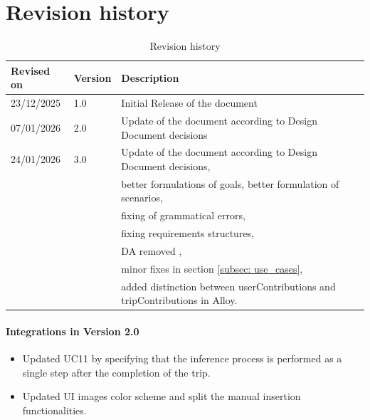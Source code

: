 \section{Revision history}
\label{sec:revision_history}%
\label{sec:definition_acronyms_abbreviations}%
\begin{table}[H]
    \begin{center}
        \begin{tabular}{ |l|l|l|}
            \hline
            \textbf{Revised on} & \textbf{Version}   & \textbf{Description}                           \\
            \hline
            23/12/2025             & 1.0   &   Initial Release of the document  \\
            \hline
            07/01/2026             & 2.0   &   Update of the document according to Design Document decisions  \\
            \hline
            24/01/2026             & 3.0   &   Update of the document according to Design Document decisions,\\ & &better formulations of goals, better formulation of scenarios,\\ & &fixing of grammatical errors,\\ & &fixing requirements structures, \\ & & DA removed ,\\ & & minor fixes in section \ref{subsec: use_cases}, \\ & &
            added distinction between userContributions and tripContributions in Alloy.
            \hline
         \end{tabular}
         \caption{Revision history}
        \label{tab:acronyms}%
    \end{center}
\end{table}

\paragraph{Integrations in Version 2.0}
\begin{itemize}

    \item Updated UC11 by specifying that the inference process is performed as a single step after the completion of the trip.
    \item Updated UI images color scheme and split the manual insertion functionalities.

    
\end{itemize}

